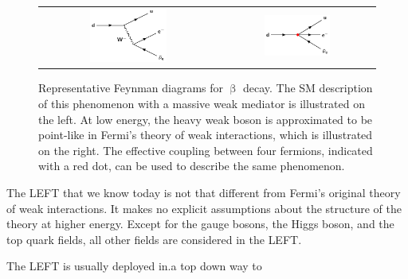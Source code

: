 \begin{figure}[tbh!]
 \begin{center}
 \begin{tabular}{cc}
 \includegraphics[width=0.45\textwidth]{figures/Part1/EFT/BetaDecay}&
 \includegraphics[width=0.45\textwidth]{figures/Part1/EFT/FermiTheory}\\
 \end{tabular}
 \caption{Representative Feynman diagrams for $\upbeta$ decay. The \ac{SM} description of this phenomenon with a massive weak mediator is illustrated on the left. At low energy, the heavy weak boson is approximated to be point-like in Fermi's theory of weak interactions, which is illustrated on the right. The effective coupling between four fermions, indicated with a red dot, can be used to describe the same phenomenon.}
 \label{fig:FermiEFT}
 \end{center}
\end{figure}

The \ac{LEFT} that we know today is not that different from Fermi's original theory of weak interactions. It makes no explicit assumptions about the structure of the theory at higher energy. Except for the gauge bosons, the Higgs boson, and the top quark fields, all other fields are considered in the \ac{LEFT}. 

The \ac{LEFT} is usually deployed in.a top down way to  

